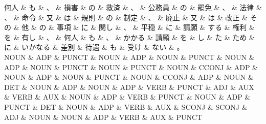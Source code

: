 \documentclass[tikz,border=5pt]{standalone}
\begin{document}
\small
\begin{dependency}[edge unit distance=6.8pt]
    \begin{deptext}[column sep=0.5em]
        何人 \& も \& 、 \& 損害 \& の \& 救済 \& 、 \& 公務員 \& の \& 罷免 \& 、 \& 法律 \& 、 \& 命令 \& 又 \& は \& 規則 \& の \& 制定 \& 、 \& 廃止 \& 又 \& は \& 改正 \& その \& 他 \& の \& 事項 \& に \& 関し \& 、 \& 平穏 \& に \& 請願 \& する \& 権利 \& を \& 有し \& 、 \& 何人 \& も \& 、 \& かかる \& 請願 \& を \& し \& た \& ため \& に \& いかなる \& 差別 \& 待遇 \& も \& 受け \& ない \& 。\\
        NOUN \& ADP \& PUNCT \& NOUN \& ADP \& NOUN \& PUNCT \& NOUN \& ADP \& NOUN \& PUNCT \& NOUN \& PUNCT \& NOUN \& CCONJ \& ADP \& NOUN \& ADP \& NOUN \& PUNCT \& NOUN \& CCONJ \& ADP \& NOUN \& DET \& NOUN \& ADP \& NOUN \& ADP \& VERB \& PUNCT \& ADJ \& AUX \& VERB \& AUX \& NOUN \& ADP \& VERB \& PUNCT \& NOUN \& ADP \& PUNCT \& DET \& NOUN \& ADP \& VERB \& AUX \& SCONJ \& SCONJ \& ADJ \& NOUN \& NOUN \& ADP \& VERB \& AUX \& PUNCT\\
    \end{deptext}
\end{dependency}
\end{document}
